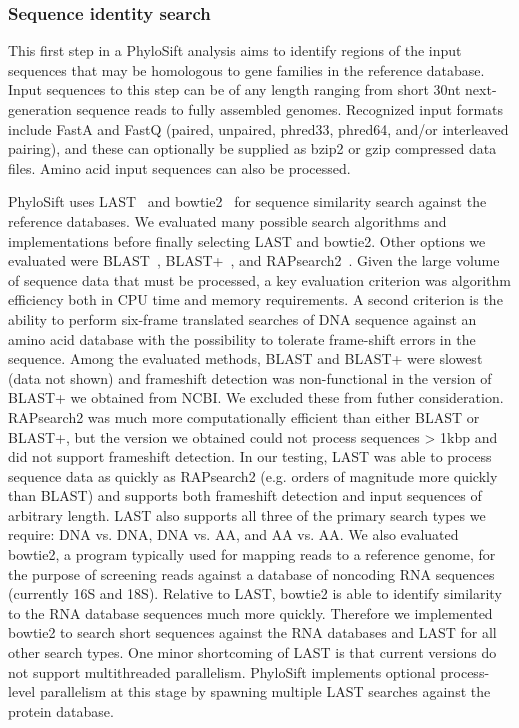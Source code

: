 \documentclass[10pt]{article}
\begin{document}
\subsubsection*{Sequence identity search}
This first step in a PhyloSift analysis aims to identify regions of the input sequences that may be homologous to gene families in the reference database.
Input sequences to this step can be of any length ranging from short 30nt next-generation sequence reads to fully assembled genomes.
Recognized input formats include FastA and FastQ (paired, unpaired, phred33, phred64, and/or interleaved pairing), and these can optionally be supplied as bzip2 or gzip compressed data files. 
Amino acid input sequences can also be processed.

PhyloSift uses LAST~\cite{Kiełbasa2011} and bowtie2~\cite{Langmead2009} for sequence similarity search against the reference databases.
We evaluated many possible search algorithms and implementations before finally selecting LAST and bowtie2. 
Other options we evaluated were BLAST~\cite{Altschul1997}, BLAST+~\cite{Camacho2009}, and RAPsearch2~\cite{Zhao2011}.
Given the large volume of sequence data that must be processed, a key evaluation criterion was algorithm efficiency both in CPU time and memory requirements. 
A second criterion is the ability to perform six-frame translated searches of DNA sequence against an amino acid database with the possibility to tolerate frame-shift errors in the sequence.
Among the evaluated methods, BLAST and BLAST+ were slowest (data not shown) and frameshift detection was non-functional in the version of BLAST+ we obtained from NCBI. We excluded these from futher consideration.
RAPsearch2 was much more computationally efficient than either BLAST or BLAST+, but the version we obtained could not process sequences > 1kbp and did not support frameshift detection.
 In our testing, LAST was able to process sequence data as quickly as RAPsearch2 (e.g. orders of magnitude more quickly than BLAST) and supports both frameshift detection and input sequences of arbitrary length.
LAST also supports all three of the primary search types we require: DNA vs. DNA, DNA vs. AA, and AA vs. AA.
We also evaluated bowtie2, a program typically used for mapping reads to a reference genome, for the purpose of screening reads against a database of noncoding RNA sequences (currently 16S and 18S).
Relative to LAST, bowtie2 is able to identify similarity to the RNA database sequences much more quickly.
Therefore we implemented bowtie2 to search short sequences against the RNA databases and LAST for all other search types.
One minor shortcoming of LAST is that current versions do not support multithreaded parallelism.
PhyloSift implements optional process-level parallelism at this stage by spawning multiple LAST searches against the protein database.
\end{document}
